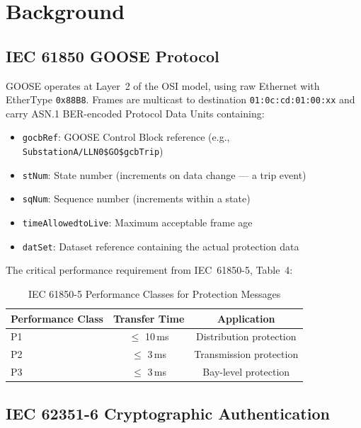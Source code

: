 \documentclass[11pt,a4paper]{article}
\begin{document}
\section{Background}

\subsection{IEC 61850 GOOSE Protocol}

GOOSE operates at Layer~2 of the OSI model, using raw Ethernet with EtherType \texttt{0x88B8}. Frames are multicast to destination \texttt{01:0c:cd:01:00:xx} and carry ASN.1 BER-encoded Protocol Data Units containing:

\begin{itemize}[leftmargin=2em]
    \item \texttt{gocbRef}: GOOSE Control Block reference (e.g., \texttt{SubstationA/LLN0\$GO\$gcbTrip})
    \item \texttt{stNum}: State number (increments on data change --- a trip event)
    \item \texttt{sqNum}: Sequence number (increments within a state)
    \item \texttt{timeAllowedtoLive}: Maximum acceptable frame age
    \item \texttt{datSet}: Dataset reference containing the actual protection data
\end{itemize}

The critical performance requirement from IEC~61850-5, Table~4:

\begin{table}[H]
\centering
\caption{IEC 61850-5 Performance Classes for Protection Messages}
\begin{tabular}{@{}lcc@{}}
\toprule
\textbf{Performance Class} & \textbf{Transfer Time} & \textbf{Application} \\
\midrule
P1 & $\leq$ 10\,ms & Distribution protection \\
P2 & $\leq$ 3\,ms & Transmission protection \\
P3 & $\leq$ 3\,ms & Bay-level protection \\
\bottomrule
\end{tabular}
\end{table}

\subsection{IEC 62351-6 Cryptographic Authentication}
\end{document}
